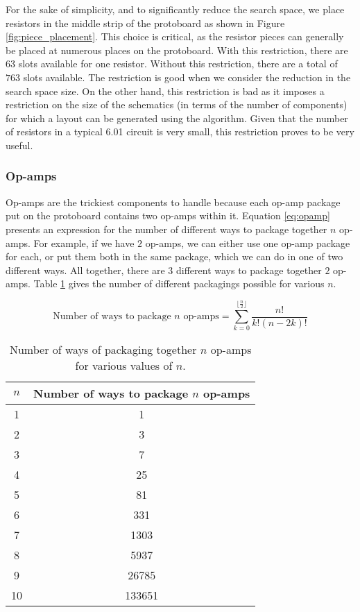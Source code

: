 For the sake of simplicity, and to significantly reduce the search space, we
place resistors in the middle strip of the protoboard as shown in Figure
\ref{fig:piece_placement}. This choice is critical,
as the resistor pieces can generally be placed at numerous places on the
protoboard.
With this restriction, there are $63$ slots available for one resistor. Without
this restriction, there are a total of $763$ slots available. The restriction is
good when we consider the reduction in the search space size. On the other hand,
this restriction is bad as it imposes a restriction on the size of the
schematics (in terms of the number of components) for which a layout can be
generated using the algorithm.
Given that the number
of resistors in a typical 6.01 circuit is very
small, this restriction proves to be very useful.

\subsubsection{Op-amps}

Op-amps are the trickiest components to handle because each op-amp package put
on the protoboard contains two op-amps within it. Equation
\ref{eq:opamp} presents an expression for the number of
different ways to package together $n$ op-amps. For example, if we have $2$
op-amps, we can either use one op-amp package for each, or put them both in the
same package, which we can do in one of two different ways. All together, there
are $3$ different ways to package together $2$ op-amps.
Table \ref{tb:opamp} gives the number of different packagings possible for
various $n$.

\begin{equation}
\text{Number of ways to package $n$ op-amps} =
\sum\limits_{k=0}^{\lfloor\frac{n}{2}\rfloor}{\frac{n!}{k!(n - 2k)!}}
\label{eq:opamp}
\end{equation}

\begin{table}
\begin{center}
\begin{singlespace}
\begin{tabular}{c | c}
$n$ & Number of ways to package $n$ op-amps \\
\hline
\hline
1 & 1 \\
2 & 3 \\
3 & 7 \\
4 & 25 \\
5 & 81 \\
6 & 331 \\
7 & 1303 \\
8 & 5937 \\
9 & 26785 \\
10 & 133651
\end{tabular}
\end{singlespace}
\end{center}
\label{tb:opamp}
\caption[Op-amp packaging possibilities]{Number of ways of packaging together
$n$ op-amps for various values of $n$.}
\end{table}

